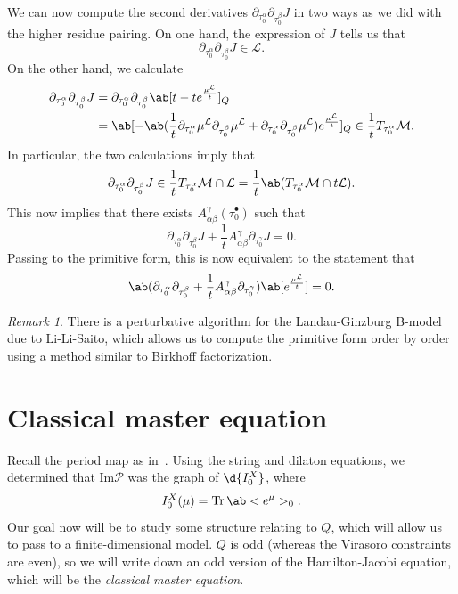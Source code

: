 \documentclass[article,10pt,oneside,oldfontcommands]{memoir}
\theoremstyle{definition}
\theoremstyle{remark}
\newtheorem{rmk}[thm]{Remark}
\theoremstyle{plain}
\theoremstyle{definition}
\theoremstyle{remark}
\newcommand{\Ima}{\mathrm{Im}}
\newcommand{\mc}[1]{\mathcal{#1}}
\newcommand{\on}[1]{\operatorname{#1}}
\newcommand{\1}{\mathbf{1}}
\newcommand{\2}{\mathbf{2}}
\newcommand{\3}{\mathbf{3}}
\begin{document}
We can now compute the second derivatives \(\partial_{\tau_0^{\alpha}} \partial_{\tau_0^{\beta}} J\) in two ways as we did with the higher residue pairing. On one hand, the expression of \(J\) tells us that
\[ \partial_{\tau_0^{\alpha}} \partial_{\tau_0^{\beta}} J \in \mc{L}. \]
On the other hand, we calculate
\begin{align*}
    \partial_{\tau_0^{\alpha}} \partial_{\tau_0^{\beta}} J &= \partial_{\tau_0^{\alpha}} \partial_{\tau_0^{\beta}} \ab[t - t e^{\frac{\mu^{\mc{L}}}{t}}]_Q \\
    &= \ab[- \ab(\frac{1}{t} \partial_{\tau_0^{\alpha}} \mu^{\mc{L}} \partial_{\tau_0^{\beta}} \mu^{\mc{L}} + \partial_{\tau_0^{\alpha}} \partial_{\tau_0^{\beta}} \mu^{\mc{L}}) e^{\frac{\mu^{\mc{L}}}{t}}]_Q \in \frac{1}{t} T_{\tau_0^{\alpha}} \mc{M}. 
\end{align*}
In particular, the two calculations imply that
\[ \partial_{\tau_0^{\alpha}} \partial_{\tau_0^{\beta}} J \in \frac{1}{t} T_{\tau_0^{\alpha}} \mc{M} \cap \mc{L} = \frac{1}{t} \ab( T_{\tau_0^{\alpha}} \mc{M} \cap t \mc{L}). \]
This now implies that there exists \(A_{\alpha\beta}^{\gamma}(\tau_0^{\bullet})\) such that 
\[ \partial_{\tau_0^{\alpha}} \partial_{\tau_0^{\beta}} J + \frac{1}{t} A_{\alpha\beta}^{\gamma} \partial_{\tau_0^{\gamma}} J = 0. \]
Passing to the primitive form, this is now equivalent to the statement that
\[ \ab(\partial_{\tau_0^{\alpha}} \partial_{\tau_0^{\beta}} + \frac{1}{t} A_{\alpha\beta}^{\gamma} \partial_{\tau_0^{\gamma}}) \ab[e^{\frac{\mu^{\mc{L}}}{t}}] = 0. \]

\begin{rmk}
    There is a perturbative algorithm for the Landau-Ginzburg B-model due to Li-Li-Saito, which allows us to compute the primitive form order by order using a method similar to Birkhoff factorization.
\end{rmk}



\chapter{Classical master equation}%
\label{cha:Classical master equation}

Recall the period map as in~. Using the string and dilaton equations, we determined that \(\Ima \mc{P}\) was the graph of \(\d{I_0^X}\), where
\[ I_0^X (\mu) = \on{Tr} \ab<e^{\mu}>_0. \]
Our goal now will be to study some structure relating to \(Q\), which will allow us to pass to a finite-dimensional model. \(Q\) is odd (whereas the Virasoro constraints are even), so we will write down an odd version of the Hamilton-Jacobi equation, which will be the \textit{classical master equation}.
\end{document}
